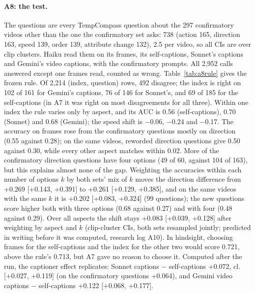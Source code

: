 \documentclass[11pt]{article}
\newcommand{\cl}{cl.}
\begin{document}
\paragraph{A8: the test.} The questions are every TempCompass question about the 297 confirmatory videos other than the one the confirmatory set asks: 738 (action 165, direction 163, speed 139, order 139, attribute change 132), 2.5 per video, so all CIs are over clip clusters. Haiku read them on its frames, its self-captions, Sonnet's captions and Gemini's video captions, with the confirmatory prompts. All 2,952 calls answered except one frames read, counted as wrong. Table~\ref{tab:a8rule} gives the frozen rule. Of 2,214 (index, question) rows, 492 disagree; the index is right on 102 of 161 for Gemini's captions, 76 of 146 for Sonnet's, and 69 of 185 for the self-captions (in A7 it was right on most disagreements for all three). Within one index the rule varies only by aspect, and its AUC is 0.56 (self-captions), 0.70 (Sonnet) and 0.68 (Gemini); the speed shift is −0.06, −0.24 and −0.17. The accuracy on frames rose from the confirmatory questions mostly on direction (0.55 against 0.28); on the same videos, reworded direction questions give 0.50 against 0.30, while every other aspect matches within 0.02. More of the confirmatory direction questions have four options (49 of 60, against 104 of 163), but this explains almost none of the gap. Weighting the accuracies within each number of options $k$ by both sets' mix of $k$ moves the direction difference from +0.269 [+0.143, +0.391] to +0.261 [+0.129, +0.385], and on the same videos with the same $k$ it is +0.202 [+0.083, +0.324] (99 questions); the new questions score higher both with three options (0.68 against 0.27) and with four (0.48 against 0.29). Over all aspects the shift stays +0.083 [+0.039, +0.128] after weighting by aspect and $k$ (clip-cluster CIs, both sets resampled jointly; predicted in writing before it was computed, research log A10). In hindsight, choosing frames for the self-captions and the index for the other two would score 0.721, above the rule's 0.713, but A7 gave no reason to choose it. Computed after the run, the captioner effect replicates: Sonnet captions − self-captions +0.072, \cl{} [+0.027, +0.119] (on the confirmatory questions +0.064), and Gemini video captions − self-captions +0.122 [+0.068, +0.177].
\end{document}
